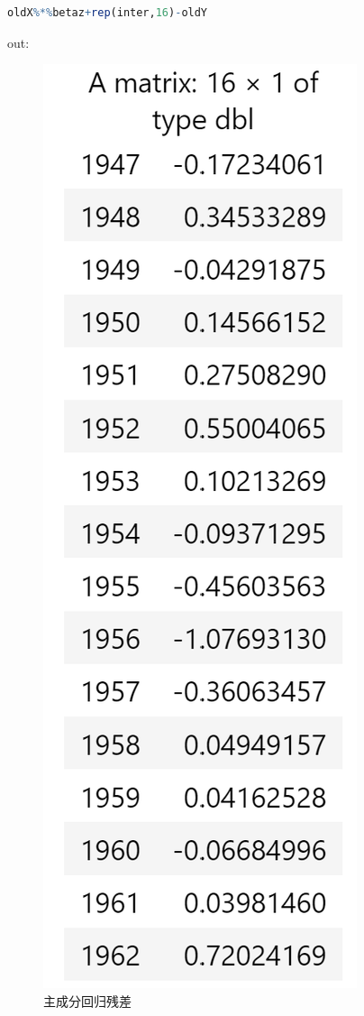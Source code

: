 \documentclass[a4paper,12pt]{article}
\begin{document}
\begin{lstlisting}[language=r,breaklines]
oldX%*%betaz+rep(inter,16)-oldY
\end{lstlisting}

out:
\begin{figure}[htbp]
	\centering
	\includegraphics[scale=0.4]{jietu3.png}
	\caption{主成分回归残差}
\end{figure}
\end{document}
